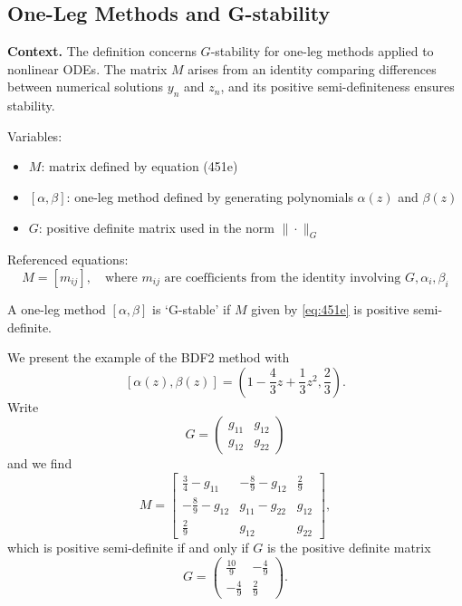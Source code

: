 \begin{theorem}
\section{One-Leg Methods and G-stability}

\noindent\textbf{Context.}
The definition concerns $G$-stability for one-leg methods applied to nonlinear ODEs. The matrix $M$ arises from an identity comparing differences between numerical solutions $y_n$ and $z_n$, and its positive semi-definiteness ensures stability.

Variables:
\begin{itemize}
    \item $M$: matrix defined by equation (451e)
    \item $[\alpha, \beta]$: one-leg method defined by generating polynomials $\alpha(z)$ and $\beta(z)$
    \item $G$: positive definite matrix used in the norm $\|\cdot\|_G$
\end{itemize}

Referenced equations:
\begin{equation}
    M = [m_{ij}], \quad \text{where } m_{ij} \text{ are coefficients from the identity involving } G, \alpha_i, \beta_i
    \tag{451e}
\end{equation}

\begin{definition}[G-stable (451A)]

  \label{def:451A}
  \uses{}
A one-leg method $[\alpha, \beta]$ is `G-stable' if $M$ given by \eqref{eq:451e} is positive semi-definite.

We present the example of the BDF2 method with
\[
[\alpha(z), \beta(z)] = \left( 1 - \frac{4}{3}z + \frac{1}{3}z^{2}, \frac{2}{3} \right).
\]
Write
\[
G = \begin{pmatrix}
g_{11} & g_{12} \\
g_{12} & g_{22}
\end{pmatrix}
\]
and we find
\[
M = \begin{bmatrix}
\frac{3}{4} - g_{11} & -\frac{8}{9} - g_{12} & \frac{2}{9} \\[2pt]
-\frac{8}{9} - g_{12} & g_{11} - g_{22} & g_{12} \\[2pt]
\frac{2}{9} & g_{12} & g_{22}
\end{bmatrix},
\]
which is positive semi-definite if and only if $G$ is the positive definite matrix
\[
G = \begin{pmatrix}
\frac{10}{9} & -\frac{4}{9} \\[2pt]
-\frac{4}{9} & \frac{2}{9}
\end{pmatrix}.
\]


\end{definition}
\end{theorem}
